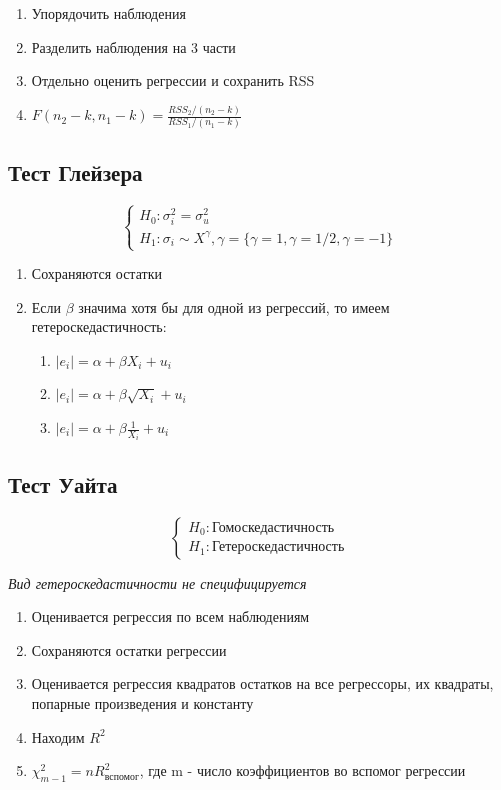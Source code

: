 \documentclass[a4paper, 12pt]{article}
\begin{document}
\begin{enumerate}
    \item Упорядочить наблюдения
    \item Разделить наблюдения на 3 части
    \item Отдельно оценить регрессии и сохранить RSS
    \item $F(n_{2} - k, n_{1} - k) = \frac{RSS_{2}/(n_{2} - k)}{RSS_{1} / (n_{1} - k)}$
\end{enumerate}

\subsection{Тест Глейзера}

\[\begin{cases}
    H_{0}: \sigma_{i}^{2} = \sigma_{u}^{2} \\
    H_{1}: \sigma_{i} \sim X^{\gamma}, \gamma = \{\gamma = 1, \gamma = 1/2, \gamma = -1\}
\end{cases}\]

\begin{enumerate}
    \item Сохраняются остатки
    \item Если $\beta$ значима хотя бы для одной из регрессий, то имеем гетероскедастичность:
    \begin{enumerate}
        \item $|e_{i}| = \alpha + \beta X_{i} + u_{i}$
        \item $|e_{i}| = \alpha + \beta \sqrt{X_{i}} + u_{i}$
        \item $|e_{i}| = \alpha + \beta \frac{1}{X_{i}} + u_{i}$
    \end{enumerate}
\end{enumerate}

\subsection{Тест Уайта}

\[\begin{cases}
    H_{0}: \textrm{Гомоскедастичность} \\
    H_{1}: \textrm{Гетероскедастичность}
\end{cases}\]

\begin{center}
    \textit{Вид гетероскедастичности не специфицируется}
\end{center}

\begin{enumerate}
    \item Оценивается регрессия по всем наблюдениям
    \item Сохраняются остатки регрессии
    \item Оценивается регрессия квадратов остатков на все регрессоры, их квадраты, попарные произведения и константу
    \item Находим $R^{2}$
    \item $\chi^{2}_{m - 1} = nR^{2}_{вспомог}$, где m - число коэффициентов во вспомог регрессии
\end{enumerate}
\end{document}
